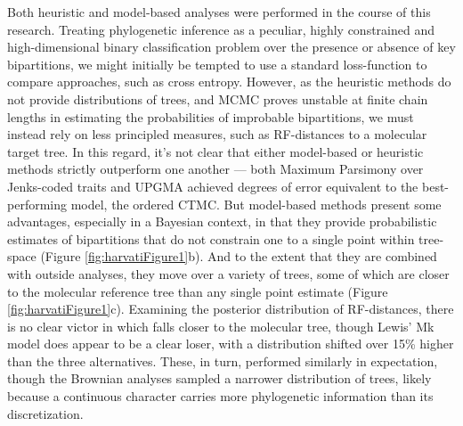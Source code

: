 Both heuristic and model-based analyses were performed in the course of this research. Treating phylogenetic inference as a peculiar, highly constrained and high-dimensional binary classification problem over the presence or absence of key bipartitions, we might initially be tempted to use a standard loss-function to compare approaches, such as cross entropy. However, as the heuristic methods do not provide distributions of trees, and MCMC proves unstable at finite chain lengths in estimating the probabilities of improbable bipartitions, we must instead rely on less principled measures, such as RF-distances to a molecular target tree. In this regard, it's not clear that either model-based or heuristic methods strictly outperform one another --- both Maximum Parsimony over Jenks-coded traits and UPGMA achieved degrees of error equivalent to the best-performing model, the ordered CTMC. But model-based methods present some advantages, especially in a Bayesian context, in that they provide probabilistic estimates of bipartitions that do not constrain one to a single point within tree-space (Figure \ref{fig:harvatiFigure1}b). And to the extent that they are combined with outside analyses, they move over a variety of trees, some of which are closer to the molecular reference tree than any single point estimate (Figure \ref{fig:harvatiFigure1}c). Examining the posterior distribution of RF-distances, there is no clear victor in which falls closer to the molecular tree, though Lewis' Mk model does appear to be a clear loser, with a distribution shifted over 15\% higher than the three alternatives. These, in turn, performed similarly in expectation, though the Brownian analyses sampled a narrower distribution of trees, likely because a continuous character carries more phylogenetic information than its discretization. 

